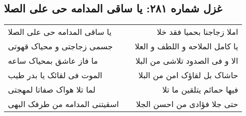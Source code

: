 \begin{center}
\section*{غزل شماره ۲۸۱: یا ساقی المدامه حی علی الصلا}
\label{sec:0281}
\begin{longtable}{l p{0.5cm} r}
یا ساقی المدامه حی علی الصلا
&&
املا زجاجنا بحمیا فقد خلا
\\
جسمی زجاجتی و محیاک قهوتی
&&
یا کامل الملاحه و اللطف و العلا
\\
ما فاز عاشق بمحیاک ساعه
&&
الا و فی الصدود تلاشی من البلا
\\
الموت فی لقائک یا بدر طیب
&&
حاشاک بل لقاؤک امن من البلا
\\
لما تلا هواک صفاتا لمهجتی
&&
فیها حمائم یتلقین ما تلا
\\
اسقیتنی المدامه من طرفک البهی
&&
حتی جلا فؤادی من احسن الجلا
\\
\end{longtable}
\end{center}
